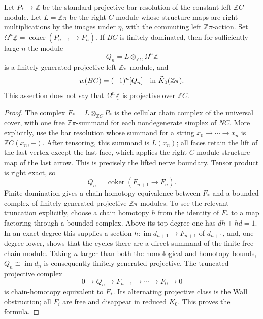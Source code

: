 \begin{proposition}
\label{D:syzygy}
Let $P_*\to\underline{\mathbb Z}$ be the standard projective bar
resolution of the constant left $\mathbb ZC$-module.  Let
$L=\mathbb Z\pi$ be the right $C$-module whose structure maps are
right multiplications by the images under $\eta$, with the commuting
left $\mathbb Z\pi$-action.  Set
$\Omega^n\underline{\mathbb Z}=\operatorname{coker}(P_{n+1}\to P_n)$.
If $BC$ is finitely dominated, then for sufficiently large $n$ the module
\[
 Q_n=L\otimes_{\mathbb ZC}\Omega^n\underline{\mathbb Z}
\]
is a finitely generated projective left $\mathbb Z\pi$-module, and
\[
 w(BC)=(-1)^n[Q_n]\quad\hbox{in }\widetilde K_0(\mathbb Z\pi).
\]
This assertion does not say that
$\Omega^n\underline{\mathbb Z}$ is projective over $\mathbb ZC$.
\end{proposition}
\begin{proof}
The complex $F_*=L\otimes_{\mathbb ZC}P_*$ is the cellular chain
complex of the universal cover, with one free $\mathbb Z\pi$-summand
for each nondegenerate simplex of $NC$.  More explicitly, use the bar
resolution whose summand for a string $x_0\to\cdots\to x_n$ is
$\mathbb ZC(x_n,-)$.  After tensoring, this summand is $L(x_n)$;
all faces retain the lift of the last vertex except the last face,
which applies the right $C$-module structure map of the last arrow.
This is precisely the lifted nerve boundary.  Tensor product is right exact, so
\[
 Q_n=\operatorname{coker}(F_{n+1}\longrightarrow F_n).
\]
Finite domination gives a chain-homotopy equivalence between $F_*$ and
a bounded complex of finitely generated projective
$\mathbb Z\pi$-modules.  To see the relevant truncation explicitly,
choose a chain homotopy $h$ from the identity of $F_*$ to a map factoring
through a bounded complex.  Above its top degree one has
$dh+hd=1$.  In an exact degree this supplies a section
$h:\operatorname{im}d_{n+1}\to F_{n+1}$ of $d_{n+1}$, and, one
degree lower, shows that the cycles there are a direct summand of the
finite free chain module.  Taking $n$ larger than both the homological
and homotopy bounds, $Q_n\cong\operatorname{im}d_n$ is consequently
finitely generated projective.  The truncated projective complex
\[
 0\longrightarrow Q_n\longrightarrow F_{n-1}\longrightarrow
 \cdots\longrightarrow F_0\longrightarrow0
\]
is chain-homotopy equivalent to $F_*$.  Its alternating projective class
is the Wall obstruction; all $F_i$ are free and disappear in reduced
$K_0$.  This proves the formula.
\end{proof}

